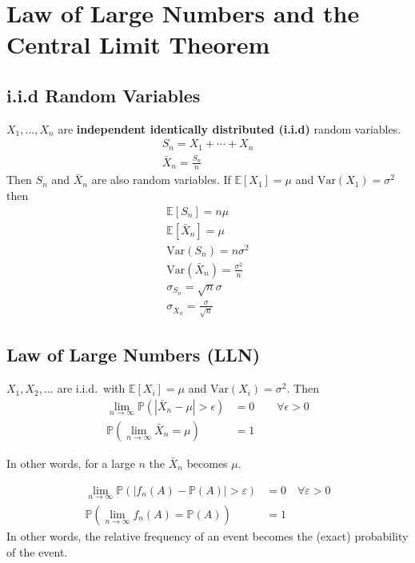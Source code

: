 \section{Law of Large Numbers and the Central Limit Theorem}

\subsection{i.i.d Random Variables}

$X_1, \ldots , X_n$ are \textbf{independent identically distributed (i.i.d)} random variables.
\begin{gather*}
    S_n = X_1 + \cdots + X_n \\
    \bar{X}_n = \frac{S_n}{n}
\end{gather*}
Then $S_n$ and $ \bar{X}_n$ are also random variables.
\newpar{}
If $\mathbb{E}[X_1]=\mu$ and $\mathrm{Var}(X_1)=\sigma^2$ then
\begin{gather*}
    \mathbb{E}[S_n]=n\mu \\
    \mathbb{E}[\bar{X}_n]=\mu \\
    \mathrm{Var}(S_n)=n\sigma^2 \\
    \mathrm{Var}(\bar{X}_n)=\frac{\sigma^2}{n} \\
    \sigma_{S_n}=\sqrt{n}\sigma \\
    \sigma_{\bar{X}_n}=\frac{\sigma}{\sqrt{n}}
\end{gather*}

\subsection{Law of Large Numbers (LLN)}
$X_1, X_2, \ldots$ are i.i.d.\ with $\mathbb{E}[X_i]=\mu$ and $\mathrm{Var}(X_i)=\sigma^2$. Then
\begin{align*}
    \lim_{n\to\infty}\mathbb{P}\left(\left|\bar{X}_n-\mu\right|>\epsilon\right) & =0 \qquad \forall \epsilon > 0 \\
    \mathbb{P}\left(\lim_{n\to\infty}\bar{X}_n=\mu\right)                       & =1
\end{align*}

In other words, for a large $n$ the $\bar{X}_n$ becomes $\mu$.

\newpar{}
\begin{align*}
    \lim_{n\to\infty}\mathbb{P}(|f_n(A)-\mathbb{P}(A)|>\varepsilon) & =0\quad \forall \varepsilon>0 \\
    \mathbb{P}\left(\lim_{n\to\infty}f_n(A)=\mathbb{P}(A)\right)    & =1
\end{align*}
In other words, the relative frequency of an event becomes the (exact) probability of the event.



